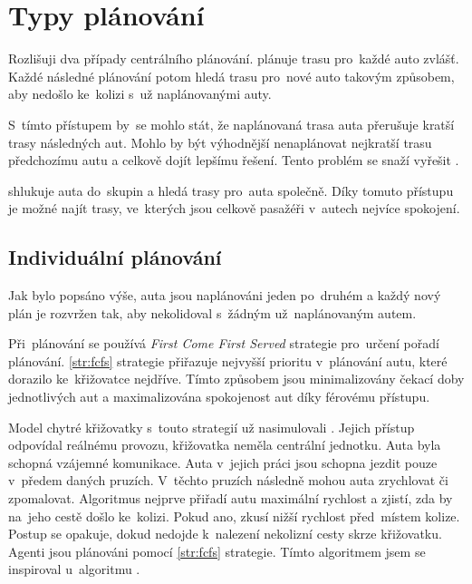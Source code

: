 \section{Typy plánování}\label{sec:typy_planovani}


Rozlišuji dva případy centrálního plánování.
\textrm{} plánuje trasu pro~každé auto zvlášť.
Každé následné plánování potom hledá trasu pro~nové auto takovým způsobem, aby nedošlo ke~kolizi s~už naplánovanými auty.

S~tímto přístupem by~se mohlo stát, že naplánovaná trasa auta přerušuje kratší trasy následných aut.
Mohlo by být výhodnější nenaplánovat nejkratší trasu předchozímu autu a celkově dojít lepšímu řešení.
Tento problém se snaží vyřešit .

\textrm{} shlukuje auta do~skupin a hledá trasy pro~auta společně.
Díky tomuto přístupu je možné najít trasy, ve~kterých jsou celkově pasažéři v~autech nejvíce spokojení.

\subsection{Individuální plánování}\label{subsec:individualni_planovani}

%
%




Jak bylo popsáno výše, auta jsou naplánováni jeden po~druhém a
každý nový plán je rozvržen tak, aby nekolidoval s~žádným už~naplánovaným autem.

Při~plánování se používá \emph{First Come First Served}  strategie pro~určení pořadí plánování.
\ref{str:fcfs} strategie přiřazuje nejvyšší prioritu v~plánování autu, které dorazilo ke~křižovatce nejdříve.
Tímto způsobem jsou minimalizovány čekací doby jednotlivých aut a maximalizována spokojenost aut díky férovému přístupu.

Model chytré křižovatky s~touto strategií už nasimulovali \citet*{Dresner}.
Jejich přístup odpovídal reálnému provozu, křižovatka neměla centrální jednotku.
Auta byla schopná vzájemné komunikace.
Auta v~jejich práci jsou schopna jezdit pouze v~předem daných pruzích.
V~těchto pruzích následně mohou auta zrychlovat či zpomalovat.
Algoritmus nejprve přiřadí autu maximální rychlost a zjistí, zda by na~jeho cestě došlo ke~kolizi.
Pokud ano, zkusí nižší rychlost před~místem kolize.
Postup se opakuje, dokud nedojde k~nalezení nekolizní cesty skrze křižovatku.
Agenti jsou plánováni pomocí \ref{str:fcfs} strategie.
Tímto algoritmem jsem se inspiroval u~algoritmu .

